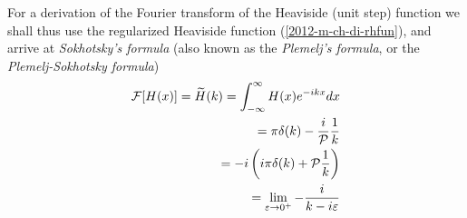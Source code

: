 {%
\eproof
}
\fi
For a derivation of  the Fourier transform of the Heaviside (unit step) function
we shall thus use the  regularized Heaviside function (\ref{2012-m-ch-di-rhfun}), and arrive at
{\em Sokhotsky's  formula} (also known as the {\em Plemelj's  formula}, or the {\em Plemelj-Sokhotsky formula})
\begin{equation}
\begin{split}
 {\cal F}[H(x)]=\widetilde{H}(k)=   \int_{-\infty}^\infty  H(x) e^{-i{kx}} dx   \\
\qquad =    \pi \delta(k) - \frac{i}{\cal P} \frac{1}{k} \\
\qquad =   -i \left(i\pi \delta(k) + {\cal P} \frac{1}{k}\right)\\
\qquad =   \lim_{\varepsilon \rightarrow 0^+} -\frac{i}{k-i\varepsilon }
\end{split}
\end{equation}

